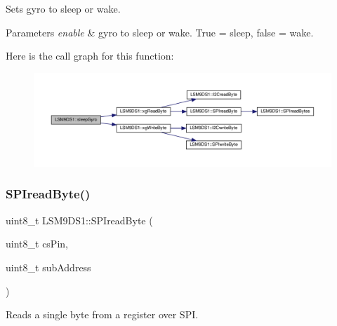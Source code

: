 Sets gyro to sleep or wake. 


\begin{DoxyParams}{Parameters}
{\em enable} & gyro to sleep or wake. True = sleep, false = wake. \\
\hline
\end{DoxyParams}
Here is the call graph for this function\+:
\nopagebreak
\begin{figure}[H]
\begin{center}
\leavevmode
\includegraphics[width=350pt]{classLSM9DS1_a13b61812069b399547f177b0b0af8fe3_cgraph}
\end{center}
\end{figure}
\mbox{\label{classLSM9DS1_a6f0f50bb5e9b702d5a19c7441a3f9d8b}} 
\subsubsection{\texorpdfstring{S\+P\+Iread\+Byte()}{SPIreadByte()}}
{\footnotesize\ttfamily uint8\+\_\+t L\+S\+M9\+D\+S1\+::\+S\+P\+Iread\+Byte (\begin{DoxyParamCaption}\item[{uint8\+\_\+t}]{cs\+Pin,  }\item[{uint8\+\_\+t}]{sub\+Address }\end{DoxyParamCaption})\hspace{0.3cm}{\ttfamily [protected]}}



Reads a single byte from a register over S\+PI. 


